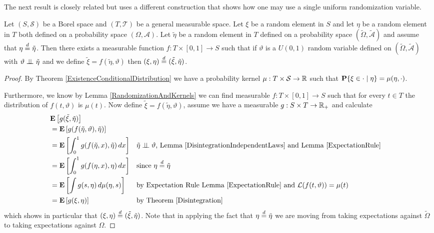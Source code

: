 The next result is closely related but uses a different construction
that shows how one may use a single uniform randomization variable.

\begin{lem}\label{Transfer}Let $(S, \mathcal{S})$ be a Borel space and $(T, \mathcal{T})$ be 
  a general measurable space.  Let $\xi$ be a random element in $S$
  and let $\eta$ be a random element in $T$ both defined on a 
  probability space $(\Omega, \mathcal{A})$.  Let $\tilde{\eta}$ be a
  random element in $T$ defined on a probability space
  $(\tilde{\Omega}, \tilde{\mathcal{A}})$ and assume that
  $\eta \overset{d}= \tilde{\eta}$.  Then there
  exists a measurable function $f : T \times [0,1] \to S$ such that if
  $\vartheta$ is a $U(0,1)$ random variable defined on
  $(\tilde{\Omega}, \tilde{\mathcal{A}})$ with
  $\vartheta \perp \! \! \! \perp_{} \tilde{\eta}$ and we define
  $\tilde{\xi} = f(\tilde{\eta}, \vartheta)$ then $(\xi, \eta) \overset{d}=
  (\tilde{\xi}, \tilde{\eta})$.
\end{lem}
\begin{proof}
By Theorem \ref{ExistenceConditionalDistribution} we have a probability kernel
$\mu : T \times \mathcal{S} \to \mathbb{R}$ such that
$\textbf{P}\{\xi \in \cdot \mid \eta\} = \mu(\eta, \cdot)$.  

Furthermore, we know by Lemma \ref{RandomizationAndKernels} we can find measurable $f : T
\times [0,1] \to S$ such that for every $t \in T$ the distribution of $f(t, \vartheta)$ is
$\mu(t)$.  Now define $\tilde{\xi} = f(\tilde{\eta}, \vartheta)$,
assume we have a measurable $g : S \times T \to \mathbb{R}_+$ and
calculate
\begin{align*}
&\textbf{E}\left[g(\tilde{\xi}, \tilde{\eta})\right] \\
&=\textbf{E}\left[g(f(\tilde{\eta}, \vartheta), \tilde{\eta})\right] \\
&= \textbf{E}\left[\int_0^1 g(f(\tilde{\eta},x), \tilde{\eta}) \, dx\right] & &
\text{$\tilde{\eta} \perp \! \! \! \perp \vartheta$, Lemma
  \ref{DisintegrationIndependentLaws} and Lemma \ref{ExpectationRule}}\\
&= \textbf{E}\left[\int_0^1 g(f(\eta,x), \eta) \, dx\right] & &
\text{since $\eta \overset{d}= \tilde{\eta}$}\\
&= \textbf{E}\left[\int g(s, \eta) \, d\mu(\eta,s)\right] & & \text{by
  Expectation Rule
  Lemma \ref{ExpectationRule} and $\mathcal{L}(f(t,\vartheta)) = \mu(t)$} \\
&= \textbf{E}\left[g(\xi, \eta)\right] & & \text{by Theorem \ref{Disintegration}}
\end{align*}
which shows in particular that $(\xi, \eta) \overset{d}= (\tilde{\xi},
\tilde{\eta})$.  Note that in applying the fact that $\eta \overset{d}=
\tilde{\eta}$ we are moving from taking expectations against
$\tilde{\Omega}$ to taking expectations against $\Omega$.
\end{proof}

